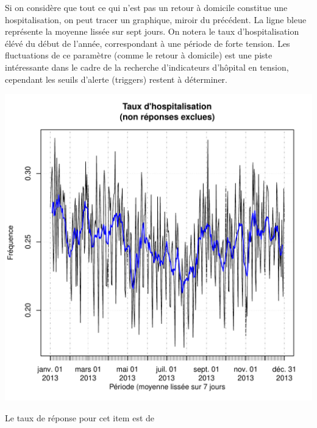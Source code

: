 \documentclass[12pt,english,french,twoside]{report}\usepackage[]{graphicx}\usepackage[]{color}
\makeatletter
\def\maxwidth{ %
  \ifdim\Gin@nat@width>\linewidth
    \linewidth
  \else
    \Gin@nat@width
  \fi
}
\newenvironment{kframe}{%
 \def\at@end@of@kframe{}%
 \ifinner\ifhmode%
  \def\at@end@of@kframe{\end{minipage}}%
  \begin{minipage}{\columnwidth}%
 \fi\fi%
 \def\FrameCommand##1{\hskip\@totalleftmargin \hskip-\fboxsep
 \colorbox{shadecolor}{##1}\hskip-\fboxsep
     \hskip-\linewidth \hskip-\@totalleftmargin \hskip\columnwidth}%
 \MakeFramed {\advance\hsize-\width
   \@totalleftmargin\z@ \linewidth\hsize
   \@setminipage}}%
 {\par\unskip\endMakeFramed%
 \at@end@of@kframe}
\makeatother
\begin{document}
Si on considère que tout ce qui n'est pas un retour à domicile constitue une hospitalisation, on peut tracer un graphique, miroir du précédent. La ligne bleue représente la moyenne lissée sur sept jours. On notera le taux d'hospitalisation élévé du début de l'année, correspondant à une période de forte tension. Les fluctuations de ce paramètre (comme le retour à domicile) est une piste intéressante dans le cadre de la recherche d'indicateurs d'hôpital en tension, cependant les seuils d'alerte (triggers) restent à déterminer.

\begin{kframe}


{\ttfamily\noindent\bfseries{}}\end{kframe}
\includegraphics[width=\maxwidth]{figure/hospit} 




Le taux de réponse pour cet item est de
\end{document}
